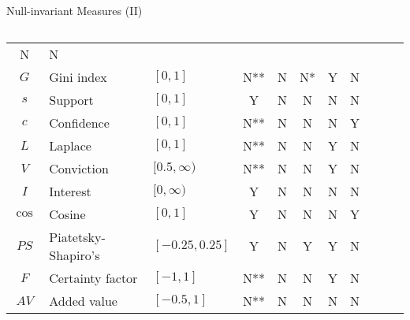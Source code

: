\begin{frame}{Null-invariant Measures (II)}
\begin{columns}
\begin{column}{0.65\textwidth}
{\begin{tabular}{|c|l|l|c|c|c|c|c|c|c|c|}
					N                     &
					N                                                                                                \\
					$G$                   & Gini index              & $[0,1]$        & N**          & N & N* &
					Y                     &
					N                                                                                                \\
					$s$                   & Support                 & $[0,1]$        & Y            & N & N  &
					N                     &
					N                                                                                                \\
					{\color{red}$c$}      & {\color{red}Confidence} &
					{\color{red}$[0,1]$}  & {\color{red}N**}        & {\color{red}N} &
					{\color{red}N}        & {\color{red}N}          & {\color{red}Y}                                 \\
					$L$                   & Laplace                 & $[0,1]$        & N**          & N & N  &
					Y                     &
					N                                                                                                \\
					$V$                   & Conviction              & $[0.5,\infty)$ & N**          & N & N  &
					Y                     &
					N                                                                                                \\
					$I$                   & Interest                & $[0,\infty)$   & Y            & N & N  &
					N                     &
					N                                                                                                \\
					{\color{red}$\cos$}   & {\color{red}Cosine}     &
					{\color{red}$[0,1]$}  & {\color{red}Y}          & {\color{red}N} &
					{\color{red}N}        & {\color{red}N}          & {\color{red}Y}
					\\
					$PS$                  & Piatetsky-Shapiro's     & $[-0.25,0.25]$ &
					Y                     & N                       & Y              & Y
					                      & N                                                                        \\
					$F$                   & Certainty factor        & $[-1,1]$       & N**          & N & N  & Y & N \\
					$AV$                  & Added value             & $[-0.5,1]$     & N**          & N & N  & N & N \\

\end{tabular}}
\end{column}
\end{columns}
\end{frame}
